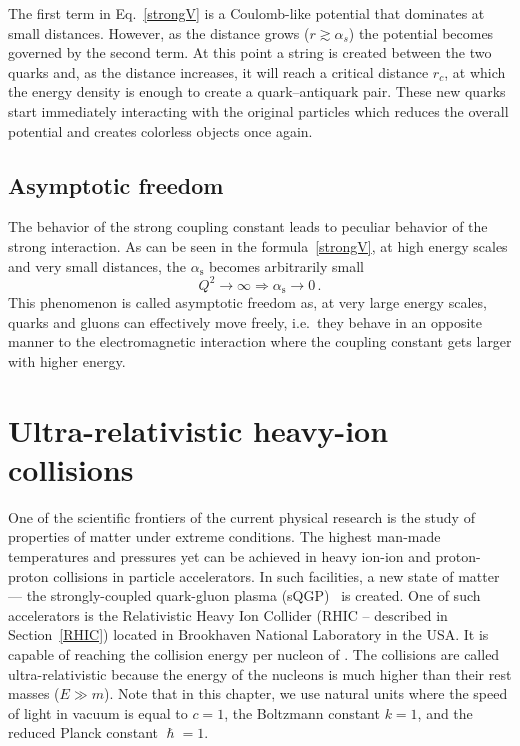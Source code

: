 The first term in Eq.\ \eqref{strongV} is a Coulomb-like potential that dominates at small distances. However, as the distance grows ($r \gtrsim \alpha_s$) the potential becomes governed by the second term.  At this point a string is created between the two quarks and, as the distance increases, it will reach a critical distance $r_c$, at which the energy density is enough to create a quark--antiquark pair. These new quarks start immediately interacting with the original particles which reduces the overall potential and creates colorless objects once again.

\subsection{Asymptotic freedom}

The behavior of the strong coupling constant leads to peculiar behavior of the strong interaction. As can be seen in the formula~\eqref{strongV}, at high energy scales and very small distances, the $\alpha_\mathrm{s}$ becomes arbitrarily small
\begin{equation}
 Q^2 \rightarrow \infty \Rightarrow \alpha_\mathrm{s} \rightarrow 0\,.
\end{equation}
This phenomenon is called asymptotic freedom as, at very large energy scales, quarks and gluons can effectively move freely, i.e.\ they behave in an opposite manner to the electromagnetic interaction where the coupling constant gets larger with higher energy.


\section{Ultra-relativistic heavy-ion collisions}
One of the scientific frontiers of the current physical research is the study of properties of matter under extreme conditions. The highest man-made temperatures and pressures yet can be achieved in heavy ion-ion and proton-proton collisions in particle accelerators.
In such facilities, a new state of matter --- the strongly-coupled quark-gluon plasma (sQGP)~\cite{QGPdiscovered} is created\@. One of such accelerators is the Relativistic Heavy Ion Collider (RHIC -- described in Section~\ref{RHIC}) located in Brookhaven National Laboratory in the USA\@. It is capable of reaching the collision energy per nucleon of \snnFull\@. The collisions are called ultra-relativistic because the energy of the nucleons is much higher than their rest masses ($E \gg m$). Note that in this chapter, we use natural units where the speed of light in vacuum is equal to $c = 1$, the Boltzmann constant $k = 1$, and the reduced Planck constant $\hslash = 1$\@. 

